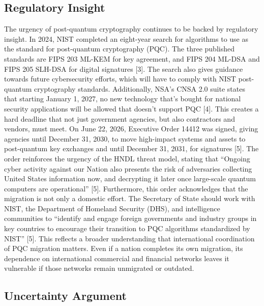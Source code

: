 \documentclass{article}
\begin{document}
\subsection{Regulatory Insight}

The urgency of post-quantum cryptography continues to be backed by regulatory insight. In 2024, NIST completed an eight-year search for algorithms to use as the standard for post-quantum cryptography (PQC). The three published standards are FIPS 203 ML-KEM for key agreement, and FIPS 204 ML-DSA and FIPS 205 SLH-DSA for digital signatures [3]. The search also gives guidance towards future cybersecurity efforts, which will have to comply with NIST post-quantum cryptography standards. Additionally, NSA’s CNSA 2.0 suite states that starting January 1, 2027, no new technology that’s bought for national security applications will be allowed that doesn’t support PQC [4]. This creates a hard deadline that not just government agencies, but also contractors and vendors, must meet. On June 22, 2026, Executive Order 14412 was signed, giving agencies until December 31, 2030, to move high-impact systems and assets to post-quantum key exchanges and until December 31, 2031, for signatures [5]. The order reinforces the urgency of the HNDL threat model, stating that “Ongoing cyber activity against our Nation also presents the risk of adversaries collecting United States information now, and decrypting it later once large-scale quantum computers are operational” [5]. Furthermore, this order acknowledges that the migration is not only a domestic effort. The Secretary of State should work with NIST, the Department of Homeland Security (DHS), and intelligence communities to “identify and engage foreign governments and industry groups in key countries to encourage their transition to PQC algorithms standardized by NIST” [5]. This reflects a broader understanding that international coordination of PQC migration matters. Even if a nation completes its own migration, its dependence on international commercial and financial networks leaves it vulnerable if those networks remain unmigrated or outdated. 

\subsection{Uncertainty Argument}
\end{document}
